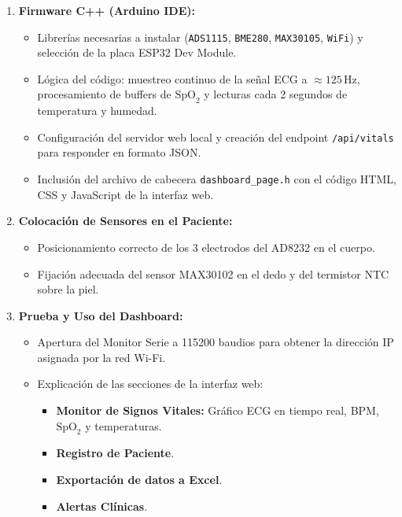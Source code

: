 \documentclass[11pt,a4paper]{article}
\begin{document}
\begin{enumerate}[label=\textbf{\arabic*.}, leftmargin=*]
    \item \textbf{Firmware C++ (Arduino IDE):}
    \begin{itemize}
        \item Librerías necesarias a instalar (\texttt{ADS1115}, \texttt{BME280}, \texttt{MAX30105}, \texttt{WiFi}) y selección de la placa ESP32 Dev Module.
        \item Lógica del código: muestreo continuo de la señal ECG a $\approx 125\,\text{Hz}$, procesamiento de buffers de $\text{SpO}_2$ y lecturas cada 2 segundos de temperatura y humedad.
        \item Configuración del servidor web local y creación del endpoint \texttt{/api/vitals} para responder en formato JSON.
        \item Inclusión del archivo de cabecera \texttt{dashboard\_page.h} con el código HTML, CSS y JavaScript de la interfaz web.
    \end{itemize}

    \item \textbf{Colocación de Sensores en el Paciente:}
    \begin{itemize}
        \item Posicionamiento correcto de los 3 electrodos del AD8232 en el cuerpo.
        \item Fijación adecuada del sensor MAX30102 en el dedo y del termistor NTC sobre la piel.
    \end{itemize}

    \item \textbf{Prueba y Uso del Dashboard:}
    \begin{itemize}
        \item Apertura del Monitor Serie a 115200 baudios para obtener la dirección IP asignada por la red Wi-Fi.
        \item Explicación de las secciones de la interfaz web:
        \begin{itemize}
            \item \textbf{Monitor de Signos Vitales:} Gráfico ECG en tiempo real, BPM, $\text{SpO}_2$ y temperaturas.
            \item \textbf{Registro de Paciente}.
            \item \textbf{Exportación de datos a Excel}.
            \item \textbf{Alertas Clínicas}.
        \end{itemize}
    \end{itemize}

\end{enumerate}
\end{document}
